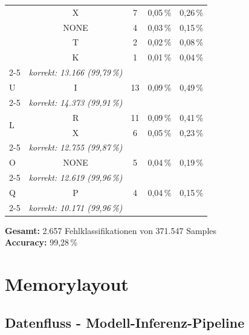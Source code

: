 \begin{longtable}{lccrr}
  & X   &   7 & 0,05\,\% & 0,26\,\% \\
  & NONE &  4 & 0,03\,\% & 0,15\,\% \\
  & T   &   2 & 0,02\,\% & 0,08\,\% \\
  & K   &   1 & 0,01\,\% & 0,04\,\% \\
\cmidrule{2-5}
  & \multicolumn{1}{l}{\emph{korrekt: 13.166 (99,79\,\%)}} & & & \\
\midrule
\multirow{1}{*}{U}
  & I   &  13 & 0,09\,\% & 0,49\,\% \\
\cmidrule{2-5}
  & \multicolumn{1}{l}{\emph{korrekt: 14.373 (99,91\,\%)}} & & & \\
\midrule
\multirow{2}{*}{L}
  & R   &  11 & 0,09\,\% & 0,41\,\% \\
  & X   &   6 & 0,05\,\% & 0,23\,\% \\
\cmidrule{2-5}
  & \multicolumn{1}{l}{\emph{korrekt: 12.755 (99,87\,\%)}} & & & \\
\midrule
\multirow{1}{*}{O}
  & NONE &  5 & 0,04\,\% & 0,19\,\% \\
\cmidrule{2-5}
  & \multicolumn{1}{l}{\emph{korrekt: 12.619 (99,96\,\%)}} & & & \\
\midrule
\multirow{1}{*}{Q}
  & P   &   4 & 0,04\,\% & 0,15\,\% \\
\cmidrule{2-5}
  & \multicolumn{1}{l}{\emph{korrekt: 10.171 (99,96\,\%)}} & & & \\
\end{longtable}

\bigskip
\textbf{Gesamt:} 2.657 Fehlklassifikationen von 371.547 Samples \\
\textbf{Accuracy:} 99,28\,\% \\[2mm]

\section{Memorylayout}\label{sec:Memorylayout}
\subsection{Datenfluss - Modell-Inferenz-Pipeline}\label{sec:datenfluss}

